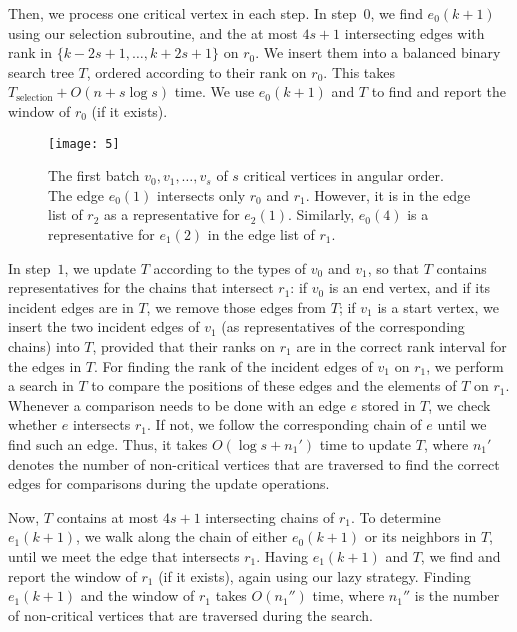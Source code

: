 \documentclass[11pt, a4paper]{article}
\begin{document}
Then, we process one critical vertex in each step.
In step~$0$, we find $e_0(k + 1)$ using our selection subroutine, and 
the at most $4s + 1$ intersecting edges with rank in 
$\{k - 2s + 1, \dots, k + 2s + 1\}$ on $r_0$. We insert them into a balanced 
binary search tree $T$, ordered according to their rank on $r_0$. 
This takes $T_\text{selection} + O(n + s\log s)$ time.
We use $e_0(k + 1)$ and $T$ to find and report the window of $r_0$ 
(if it exists).

\begin{figure}
 \centering 
 \texttt{[image: 5]}
\caption{The first batch $v_0, v_1, \dots, v_s$ of $s$ critical vertices 
  in angular order. The edge $e_0(1)$ intersects only $r_0$ and $r_1$.
  However, it is in the edge list of $r_2$ as a representative for $e_2(1)$.
  Similarly, $e_0(4)$ is a representative for $e_1(2)$ in the edge list 
  of $r_1$.}
\label{fig:fig5}
\end{figure}


In step~$1$, 
we update $T$ according to the types of $v_0$ 
and  $v_1$, so that $T$ contains representatives for 
the chains that intersect $r_1$: if 
$v_0$ is an end vertex, and if its incident edges are in $T$,
we remove those edges from $T$;
if $v_1$ is a start vertex, we insert the two incident edges
of $v_1$ 
(as representatives of the corresponding chains)
into $T$, provided that their ranks on $r_1$ 
are in the correct rank interval for the edges in $T$.
For finding the rank of the incident edges of $v_1$ on $r_1$, we 
perform a 
search in $T$ to compare the positions of these edges and the
elements of $T$ on $r_1$.
Whenever a comparison needs to be 
done with an edge $e$ stored in $T$, we check whether $e$
intersects $r_1$. If not, we follow the corresponding chain of $e$
until we find such an edge.
Thus, it takes $O(\log s + n_1')$ time to update $T$, where
$n_1'$ denotes the number of non-critical vertices that are traversed
to find the correct edges for comparisons during the update
operations. 

Now, $T$ contains 
at most $4s + 1$ intersecting chains of $r_1$. To determine  
$e_{1}(k+1)$, we walk along the chain of either $e_{0}(k+1)$ 
or its neighbors in $T$, until we meet the edge that 
intersects $r_1$.
Having $e_{1}(k+1)$ and $T$, we find and report
the window of $r_1$ (if it exists), again using our lazy strategy.
Finding $e_{1}(k+1)$ and the window of $r_1$
takes $O(n_1'')$ time, where $n_1''$ is the number of non-critical
vertices that are traversed during the search. 
\end{document}
